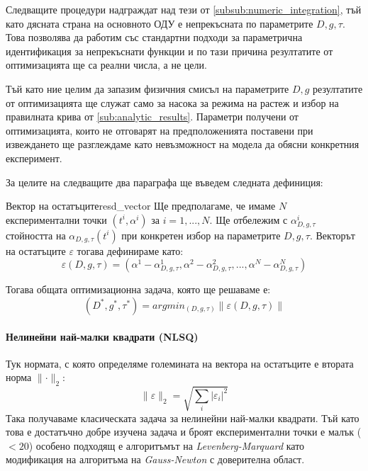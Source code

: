 Следващите процедури надграждат над тези от \autoref{subsub:numeric_integration}, тъй като дясната страна на основното ОДУ е непрекъсната по параметрите $D, g, \tau$. Това позволява да работим със стандартни подходи за параметрична идентификация за непрекъснати функции и по тази причина резултатите от оптимизацията ще са реални числа, а не цели. 

Тъй като ние целим да запазим физичния смисъл на параметрите $D, g$ резултатите от оптимизацията ще служат само за насока за режима на растеж и избор на правилната крива от \autoref{sub:analytic_results}. Параметри получени от оптимизацията, които не отговарят на предположенията поставени при извеждането ще разглеждаме като невъзможност на модела да обясни конкретния експеримент. 

За целите на следващите два параграфа ще въведем следната дефиниция:
\begin{definition}{Вектор на остатъците}{resd_vector}
    Ще предполагаме, че имаме $N$ експериментални точки $(t^{i}, \alpha^i)$ за $i = 1,...,N$. Ще отбележим с $\alpha_{D,g,\tau}^i$ стойността на $\alpha_{D,g,\tau}(t^i)$ при конкретен избор на параметрите $D, g, \tau$. Векторът на остатъците $\varepsilon$ тогава дефинираме като:
    \begin{equation*}
        \label{eq:resd_vector}
        \varepsilon(D, g, \tau) = \left( \alpha^1 - \alpha_{D,g,\tau}^1, \alpha^2 - \alpha_{D,g,\tau}^2,  ..., \alpha^N - \alpha_{D,g,\tau}^N \right)
    \end{equation*}
\end{definition}
\noindent Тогава общата оптимизационна задача, която ще решаваме е:
\begin{equation}
    \label{eq:optmiz_problem}
    (D^*, g^*, \tau^*) = argmin_{(D, g, \tau)} \lVert \varepsilon(D, g, \tau) \rVert
\end{equation}

\paragraph{Нелинейни най-малки квадрати (NLSQ)} Тук нормата, с която определяме големината на вектора на остатъците е втората норма $\lVert \cdot \rVert_{2}$:
\begin{equation*}
    \lVert  \varepsilon \rVert_{2} = \sqrt{\sum_{i} | \varepsilon_i| ^ 2}
\end{equation*}
Така получаваме класическата задача за нелинейни най-малки квадрати. Тъй като това е достатъчно добре изучена задача и броят експериментални точки е малък ($<20$) особено подходящ е алгоритъмът на \textit{Levenberg-Marquard} като модификация на алгоритъма на \textit{Gauss-Newton} с доверителна област. \cite{Kelley1999} 

